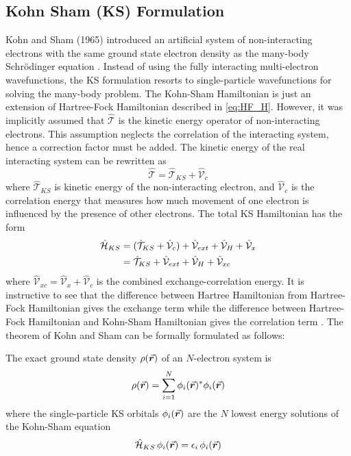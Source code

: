 \subsection{Kohn Sham (KS) Formulation}
Kohn and Sham (1965) introduced an artificial system of non-interacting electrons with the same ground state electron density as the many-body Schr\"{o}dinger equation \citep{Kohn1965}. Instead of using the fully interacting multi-electron wavefunctions, the KS formulation resorts to single-particle wavefunctions for solving the many-body problem. The Kohn-Sham Hamiltonian is just an extension of Hartree-Fock Hamiltonian described in \eqref{eq:HF_H}. However, it was implicitly assumed that $\hat{\mathcal{T}}$ is the  kinetic energy operator of non-interacting electrons. This assumption neglects the correlation of the interacting system, hence a correction factor must be added. The kinetic energy of the real interacting system can be rewritten as
\begin{equation}
	\hat{\mathcal{T}} = \hat{\mathcal{T}}_{KS} +  \hat{\mathcal{V}}_c
\end{equation}
where $\hat{\mathcal{T}}_{KS}$ is kinetic energy of the non-interacting electron, and $\hat{\mathcal{V}}_c$ is the correlation energy that measures how much movement of one electron is influenced by the presence of other electrons. The total KS Hamiltonian has the form
\begin{align} \label{eq:H_KS}
	\hat{\mathcal{H}}_{KS} & = (\hat{\mathcal{T}}_{KS} +  \hat{\mathcal{V}}_c)  + \hat{\mathcal{V}}_{ext} + \hat{\mathcal{V}}_H + \hat{\mathcal{V}}_x \notag \\
	                       & = \hat{\mathcal{T}}_{KS} + \hat{\mathcal{V}}_{ext} + \hat{\mathcal{V}}_H + \hat{\mathcal{V}}_{xc}
\end{align}
where $\hat{\mathcal{V}}_{xc} = \hat{\mathcal{V}}_{x} + \hat{\mathcal{V}}_{c}$ is the combined exchange-correlation energy.  It is instructive to see that the difference between Hartree Hamiltonian from Hartree-Fock Hamiltonian gives the exchange term while the difference between Hartree-Fock Hamiltonian and Kohn-Sham Hamiltonian gives the correlation term \citep{Cottenier2002}. The theorem of Kohn and Sham can be formally formulated as follows:

The exact ground state density $\rho({\va*{r}})$ of an $N$-electron system is
\begin{equation} \label{eq:charge_dens}
	\rho({\va*{r}}) = \sum_{i=1}^N \phi_i(\va*{r})^* \phi_i(\va*{r})
\end{equation}
where the single-particle KS orbitals $\phi_i(\va*{r})$ are the $N$ lowest energy solutions of the Kohn-Sham equation
\begin{equation}\label{eq:KS}
	\hat{\mathcal{H}}_{KS}\, \phi_i(\va*{r}) = \epsilon_i\, \phi_i(\va*{r})
\end{equation}
